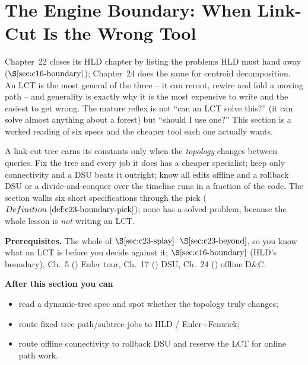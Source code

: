 \section{The Engine Boundary: When Link-Cut Is the Wrong Tool}\label{sec:c23-boundary}

\begin{previouslybox}
Chapter~22 closes its HLD chapter by listing the problems HLD must hand away
(\(\secref{c16-boundary}\)); Chapter~24 does the same for centroid decomposition.
An LCT is the most general of the three -- it can reroot, rewire and fold a moving
path -- and generality is exactly why it is the most expensive to write and the
easiest to get wrong. The mature reflex is not ``can an LCT solve this?'' (it can
solve almost anything about a forest) but ``should I use one?'' This section is a
worked reading of six specs and the cheaper tool each one actually wants.
\end{previouslybox}

\begin{topicintro}
A link-cut tree earns its constants only when the \emph{topology} changes between
queries. Fix the tree and every job it does has a cheaper specialist; keep only
connectivity and a DSU beats it outright; know all edits offline and a rollback DSU
or a divide-and-conquer over the timeline runs in a fraction of the code. The
section walks six short specifications through the pick
(\(\defref{c23-boundary-pick}\)); none has a solved problem, because the whole
lesson is \emph{not} writing an LCT.

\textbf{Prerequisites.} The whole of \(\secref{c23-splay}\)--\(\secref{c23-beyond}\),
so you know what an LCT is before you decide against it; \(\secref{c16-boundary}\)
(HLD's boundary), Ch.~5 () Euler tour, Ch.~17 () DSU, Ch.~24
() offline D\&C.

\textbf{After this section you can}
\begin{itemize}[nosep]
  \item read a dynamic-tree spec and spot whether the topology truly changes; \hfill{}
  \item route fixed-tree path/subtree jobs to HLD / Euler+Fenwick; \hfill{}
  \item route offline connectivity to rollback DSU and reserve the LCT for online path work. \hfill{}
\end{itemize}
\end{topicintro}

